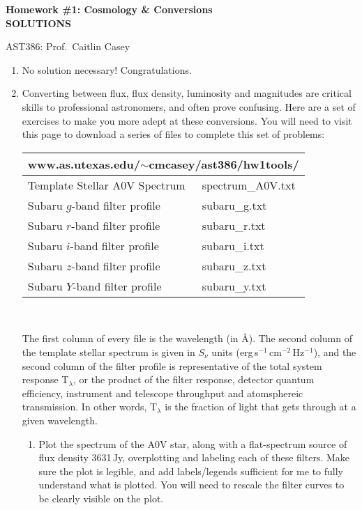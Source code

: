 \documentclass[11pt]{article}
\begin{document}
\begin{center}
\textbf{\large Homework \#1: Cosmology \& Conversions}\\
\textbf{\large SOLUTIONS}
\vspace{2mm}

{\sc AST386: Prof.\ Caitlin Casey}
\end{center}
\vspace{4mm}

\begin{enumerate}
\item No solution necessary! Congratulations.

\item Converting between flux, flux density, luminosity and magnitudes
  are critical skills to professional astronomers, and often prove
  confusing.  Here are a set of exercises to make you more adept at
  these conversions.  You will need to visit this page to download a
  series of files to complete this set of problems:\\
  \begin{center}
\vspace{-0.5cm}
  \begin{tabular}{|l|l|}
    \multicolumn{2}{c}{www.as.utexas.edu/$\sim$cmcasey/ast386/hw1tools/}\\
    \hline
    Template Stellar A0V Spectrum & spectrum\_A0V.txt \\
    \hline
    Subaru $g$-band filter profile & subaru\_g.txt \\
    \hline
    Subaru $r$-band filter profile & subaru\_r.txt \\
    \hline
    Subaru $i$-band filter profile & subaru\_i.txt \\
    \hline
    Subaru $z$-band filter profile & subaru\_z.txt \\
    \hline
    Subaru $Y$-band filter profile & subaru\_y.txt \\
    \hline
  \end{tabular}\\
  \end{center}
  The first column of every file is the wavelength (in \AA).  The
  second column of the template stellar spectrum is given in $S_{\nu}$
  units (erg\,s$^{-1}$\,cm$^{-2}$\,Hz$^{-1}$), and the second column
  of the filter profile is representative of the total system response
  T$_\lambda$, or the product of the filter response, detector quantum
  efficiency, instrument and telescope throughput and atomsphereic
  transmission.  In other words, T$_\lambda$ is the fraction of light
  that gets through at a given wavelength.
  \begin{enumerate}
    \item Plot the spectrum of the A0V star, along with a
      flat-spectrum source of flux density 3631\,Jy, overplotting and
      labeling each of these filters.  Make sure the plot is legible,
      and add labels/legends sufficient for me to fully understand
      what is plotted.  You will need to rescale the filter curves to
      be clearly visible on the plot.


\end{enumerate}
\end{enumerate}
\end{document}
